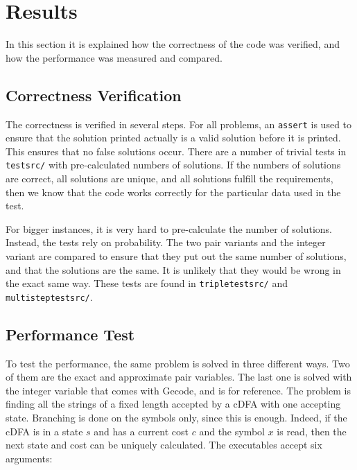 \documentclass[a4paper,11pt]{article}
\begin{document}
\section{Results}
In this section it is explained how the correctness of the code was verified, and how the performance was measured and compared.

\subsection{Correctness Verification}
The correctness is verified in several steps. For all problems, an \texttt{assert} is used to ensure that the solution printed actually is a valid solution before it is printed. This ensures that no false solutions occur. There are a number of trivial tests in \texttt{testsrc/} with pre-calculated numbers of solutions. If the numbers of solutions are correct, all solutions are unique, and all solutions fulfill the requirements, then we know that the code works correctly for the particular data used in the test.

For bigger instances, it is very hard to pre-calculate the number of solutions. Instead, the tests rely on probability. The two pair variants and the integer variant are compared to ensure that they put out the same number of solutions, and that the solutions are the same. It is unlikely that they would be wrong in the exact same way. These tests are found in \texttt{tripletestsrc/} and \texttt{multisteptestsrc/}.

\subsection{Performance Test}
\label{sec:performancetest}
To test the performance, the same problem is solved in three different ways. Two of them are the exact and approximate pair variables. The last one is solved with the integer variable that comes with Gecode, and is for reference. The problem is finding all the strings of a fixed length accepted by a cDFA with one accepting state. Branching is done on the symbols only, since this is enough. Indeed, if the cDFA is in a state $s$ and has a current cost $c$ and the symbol $x$ is read, then the next state and cost can be uniquely calculated. The executables accept six arguments: 
\end{document}
